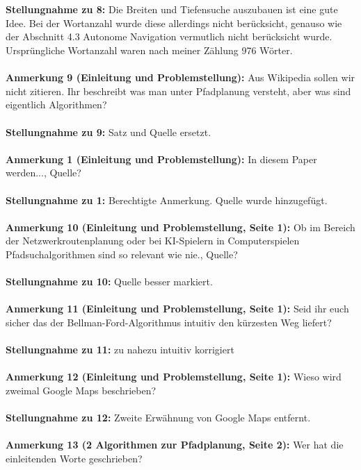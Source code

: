 \documentclass[a4paper,12pt]{book}
\begin{document}
\\ \\
\textbf{Stellungnahme zu 8:}
Die Breiten und Tiefensuche auszubauen ist eine gute Idee. Bei der Wortanzahl wurde diese allerdings nicht berücksicht, genauso wie der Abschnitt 4.3 Autonome Navigation vermutlich nicht berücksicht wurde.
Ursprüngliche Wortanzahl waren nach meiner Zählung 976 Wörter.
\\ \\
\textbf{Anmerkung 9 (Einleitung und Problemstellung):}
Aus Wikipedia sollen wir nicht zitieren. Ihr beschreibt was man unter Pfadplanung versteht, aber was sind eigentlich Algorithmen?
\\ \\
\textbf{Stellungnahme zu 9:}
Satz und Quelle ersetzt.
\\ \\
\textbf{Anmerkung 1 (Einleitung und Problemstellung):}
\glqq In diesem Paper werden...\grqq, Quelle?
\\ \\
\textbf{Stellungnahme zu 1:}
Berechtigte Anmerkung. Quelle wurde hinzugefügt.
\\ \\
\textbf{Anmerkung 10 (Einleitung und Problemstellung, Seite 1):}
\glqq Ob im Bereich der Netzwerkroutenplanung oder bei KI-Spielern in Computerspielen Pfadsuchalgorithmen sind so relevant wie nie.\grqq, Quelle? 
\\ \\
\textbf{Stellungnahme zu 10:}
Quelle besser markiert.
\\ \\
\textbf{Anmerkung 11 (Einleitung und Problemstellung, Seite 1):}
Seid ihr euch sicher das der Bellman-Ford-Algorithmus \glqq intuitiv\grqq{} den kürzesten Weg liefert?
\\ \\
\textbf{Stellungnahme zu 11:}
zu \glqq nahezu intuitiv \grqq korrigiert
\\ \\
\textbf{Anmerkung 12 (Einleitung und Problemstellung, Seite 1):}
Wieso wird zweimal Google Maps beschrieben? 
\\ \\
\textbf{Stellungnahme zu 12:}
Zweite Erwähnung von Google Maps entfernt.
\\ \\
\textbf{Anmerkung 13 (2 Algorithmen zur Pfadplanung, Seite 2):}
Wer hat die einleitenden Worte geschrieben?
 \\  \\
\end{document}
